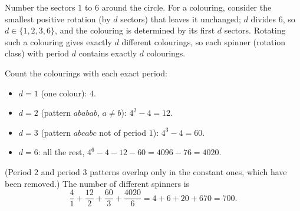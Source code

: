 Number the sectors $1$ to $6$ around the circle. For a colouring, consider the smallest positive rotation (by $d$ sectors) that leaves it unchanged; $d$ divides $6$, so $d\in\{1,2,3,6\}$, and the colouring is determined by its first $d$ sectors. Rotating such a colouring gives exactly $d$ different colourings, so each spinner (rotation class) with period $d$ contains exactly $d$ colourings.

Count the colourings with each exact period:
\begin{itemize}
\item $d=1$ (one colour): $4$.
\item $d=2$ (pattern $ababab$, $a\ne b$): $4^2-4=12$.
\item $d=3$ (pattern $abcabc$ not of period $1$): $4^3-4=60$.
\item $d=6$: all the rest, $4^6-4-12-60=4096-76=4020$.
\end{itemize}
(Period $2$ and period $3$ patterns overlap only in the constant ones, which have been removed.) The number of different spinners is
\[
\dfrac{4}{1}+\dfrac{12}{2}+\dfrac{60}{3}+\dfrac{4020}{6}=4+6+20+670=\boxed{700}.
\]
